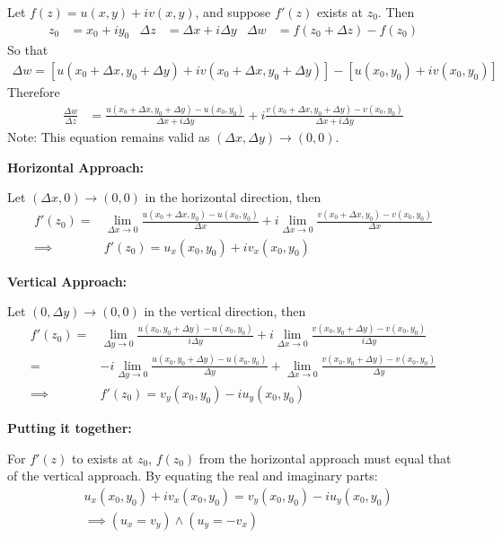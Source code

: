 \documentclass[12pt, english]{book}
\makeatletter
\renewenvironment{proof}[1][\proofname]{\par
	\pushQED{\qed}%
	\normalfont \topsep6\p@\@plus6\p@\relax
	\list{}{%
		\settowidth{\leftmargin}{\itshape\proofname:\hskip\labelsep}%
		\setlength{\labelwidth}{0pt}%
		\setlength{\itemindent}{-\leftmargin}%
		}%
	\item[\hskip\labelsep\itshape#1\@addpunct{:}]\ignorespaces
	}{\popQED\endlist\@endpefalse}
\makeatother
\begin{document}
	\begin{proof}
		Let \(f(z) = u(x,y) + iv(x,y)\), and suppose $f'(z)$ exists at $z_0$. Then 
		\begin{align*}
			z_0 &= x_0 + iy_0	&	\Delta z &= \Delta x + i\Delta y
			&	\Delta w &= f(z_0 + \Delta z) - f(z_0)
		\end{align*}
		So that
		\begin{align*}
			\Delta w = [u(x_0 + \Delta x, y_0 + \Delta y) + iv(x_0 + \Delta x, y_0 + \Delta y)] - [u(x_0, y_0) + iv(x_0, y_0)]
		\end{align*}
		Therefore
		\begin{align*}
			\frac{\Delta w}{\Delta z}
			&= \frac{u(x_0 + \Delta x, y_0 + \Delta y) - u(x_0, y_0)}{\Delta x + i\Delta y} + i\frac{v(x_0 + \Delta x, y_0 + \Delta y) - v(x_0, y_0)}{\Delta x + i\Delta y}
		\end{align*}
		Note: This equation remains valid as \((\Delta x, \Delta y) \rightarrow (0,0)\).
		
		\textbf{Horizontal Approach:}
		
		Let \((\Delta x, 0) \rightarrow (0,0)\) in the horizontal direction, then 
		\begin{align*}
			f'(z_0) 
			=& \lim_{\Delta x \rightarrow 0} \frac{u(x_0 + \Delta x, y_0) - u(x_0, y_0)}{\Delta x} + i \lim_{\Delta x \rightarrow 0} \frac{v(x_0 + \Delta x, y_0) - v(x_0, y_0)}{\Delta x} \\
			\implies& f'(z_0) = u_x(x_0, y_0) + iv_x(x_0, y_0)
		\end{align*}
		
		\textbf{Vertical Approach:}
		
		Let \((0, \Delta y) \rightarrow (0,0)\) in the vertical direction, then
		\begin{align*}
			f'(z_0) 
			=& \lim_{\Delta y \rightarrow 0} \frac{u(x_0, y_0 + \Delta y) - u(x_0, y_0)}{i \Delta y} + i \lim_{\Delta x \rightarrow 0} \frac{v(x_0, y_0+\Delta y) - v(x_0, y_0)}{i \Delta y} \\
			=& - i \lim_{\Delta y \rightarrow 0} \frac{u(x_0, y_0 + \Delta y) - u(x_0, y_0)}{ \Delta y} + \lim_{\Delta x \rightarrow 0} \frac{v(x_0, y_0+\Delta y) - v(x_0, y_0)}{\Delta y} \\
			\implies& f'(z_0) = v_y(x_0, y_0) - iu_y(x_0, y_0)
		\end{align*}
		
		\textbf{Putting it together:}
		
		For \(f'(z)\) to exists at \(z_0\), \(f(z_0)\) from the horizontal approach must equal that of the vertical approach. By equating the real and imaginary parts: 
		\begin{align*}
			&u_x(x_0, y_0) + iv_x(x_0, y_0) = v_y(x_0, y_0) - iu_y(x_0, y_0)\\
			&\implies (u_x = v_y) \land (u_y = - v_x)
		\end{align*}
		
	\end{proof}
	
\end{document}
